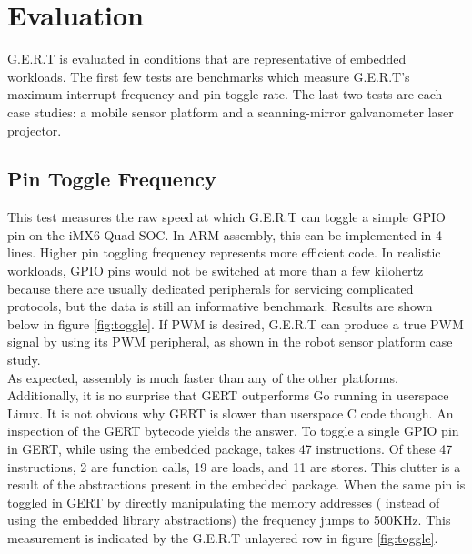 \chapter{Evaluation}

G.E.R.T is evaluated in conditions that are representative of embedded workloads.
The first few tests are benchmarks which measure G.E.R.T's maximum interrupt
frequency and pin toggle rate. The last two tests are each case studies: a mobile
sensor platform and a scanning-mirror galvanometer laser projector.

\section{Pin Toggle Frequency}
This test measures the raw speed at which G.E.R.T can toggle a simple GPIO pin on
the iMX6 Quad SOC. In ARM assembly, this can be implemented in 4 lines. Higher pin
toggling frequency represents more efficient code. In realistic workloads, GPIO pins
would not be switched at more than a few kilohertz because there are usually dedicated
peripherals for servicing complicated protocols, but the data is still an informative
benchmark. Results are shown below in figure \ref{fig:toggle}. If PWM is desired,
G.E.R.T can produce a true PWM signal by using its PWM peripheral, as shown
in the robot sensor platform case study. \\

As expected, assembly is much faster than any of the other platforms. Additionally,
it is no surprise that GERT outperforms Go running in userspace Linux. It is not obvious
why GERT is slower than userspace C code though. An inspection of the GERT bytecode
yields the answer. To toggle a single GPIO pin in GERT, while using the embedded package,
takes 47 instructions. Of these 47 instructions, 2 are function calls, 19 are loads, and 11
are stores. This clutter is a result of the abstractions present in the embedded package.
When the same pin is toggled in GERT by directly manipulating the memory addresses (
instead of using the embedded library abstractions) the
frequency jumps to 500KHz. This measurement is indicated by the G.E.R.T unlayered row
in figure \ref{fig:toggle}.

